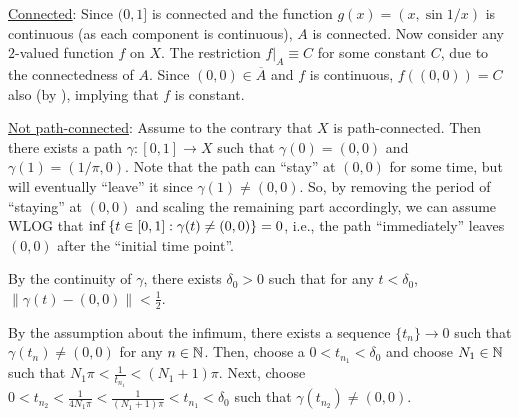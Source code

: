 \begin{enumerate}
\begin{pf}
\underline{Connected}: Since \((0,1]\) is connected and the function
\(g(x)=(x,\sin 1/x)\) is continuous (as each component is continuous), \(A\) is
connected. Now consider any \(2\)-valued function \(f\) on \(X\). The
restriction \(f|_{A}\equiv C\) for some constant \(C\), due to the
connectedness of \(A\). Since \((0,0)\in\overline{A}\) and \(f\) is continuous,
\(f((0,0))=C\) also (by ),
implying that \(f\) is constant.

\underline{Not path-connected}: Assume to the contrary that \(X\) is
path-connected. Then there exists a path \(\gamma:[0,1]\to X\) such that
\(\gamma(0)=(0,0)\) and \(\gamma(1)=(1/\pi,0)\). Note that the path can
``stay'' at \((0,0)\) for some time, but will eventually ``leave'' it since
\(\gamma(1)\ne (0,0)\). So, by removing the period of ``staying'' at \((0,0)\)
and scaling the remaining part accordingly, we can assume WLOG that
\(\inf\qty{t\in [0,1]: \gamma(t)\ne (0,0)}=0\), i.e., the path ``immediately''
leaves \((0,0)\) after the ``initial time point''.
\begin{center}
\end{center}

By the continuity of \(\gamma\), there exists \(\delta_0>0\) such
that for any \(t<\delta_0\), \(\|\gamma(t)-(0,0)\|<\frac{1}{2}\).

By the assumption about the infimum, there exists a sequence \(\{t_n\}\to 0\)
such that \(\gamma(t_n)\ne (0,0)\) for any \(n\in\mathbb{N}\). Then, choose a
\(0<t_{n_1}<\delta_0\) and choose \(N_1\in\mathbb{N}\) such that
\(\displaystyle N_1\pi<\frac{1}{t_{n_1}}<(N_1+1)\pi\). Next, choose
\(\displaystyle
0<t_{n_2}<\frac{1}{4N_1\pi}<\frac{1}{(N_1+1)\pi}<t_{n_1}<\delta_0\) such that
\(\gamma(t_{n_2})\ne (0,0)\).


\end{pf}
\end{enumerate}
